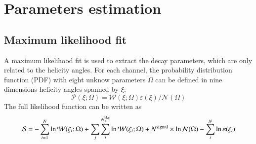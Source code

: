\section{Parameters estimation}
\subsection{Maximum likelihood fit}

A maximum likelihood fit is used to extract the decay parameters, which are only 
related to the helicity angles. For each channel, the probability distribution 
function (PDF) with eight unknow parameters $\Omega$ can be defined in nine dimensions
helicity angles spanned by $\xi$:
\begin{equation}
	\mathcal{P}(\xi;\Omega) = \mathcal{W}(\xi;\Omega)\varepsilon(\xi)/\mathcal{N}(\Omega)
\end{equation}
The full likelihood function can be written as 
\begin{equation}
	\mathcal{S} = -\sum_{i = 1}^N\ln \mathcal{W}(\xi_i;\Omega) + 
	\sum_j \sum_i^{N_j^{\rm bkg}}\ln \mathcal{W}(\xi_i;\Omega)
	+ N^{\rm signal} \times \ln \mathcal{N}(\Omega) - \sum_i^N \ln \varepsilon(\xi_i)
\end{equation}

